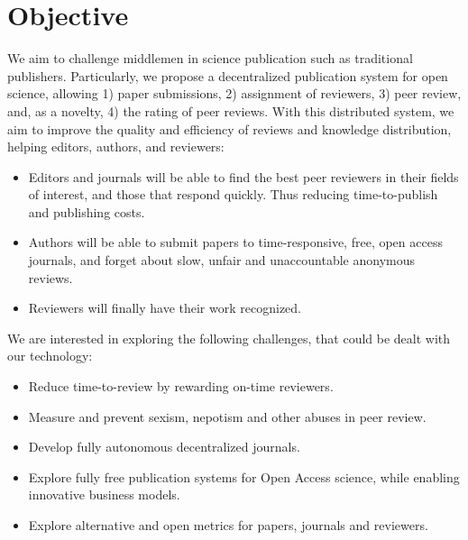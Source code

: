 \section{Objective}

We aim to challenge middlemen in science publication such as traditional
publishers. Particularly, we propose a decentralized publication system for open
science, allowing 1) paper submissions, 2) assignment of reviewers, 3) peer
review, and, as a novelty, 4) the rating of peer reviews. With this distributed
system, we aim to improve the quality and efficiency of reviews and knowledge
distribution, helping editors, authors, and reviewers:
\begin{itemize}
\item Editors and journals will be able to find the best peer reviewers in their
  fields of interest, and those that respond quickly. Thus reducing
  time-to-publish and publishing costs.
\item Authors will be able to submit papers to time-responsive, free, open
  access journals, and forget about slow, unfair and unaccountable anonymous
  reviews.
\item Reviewers will finally have their work recognized.
\end{itemize}

We are interested in exploring the following challenges, that could be dealt
with our technology:
\begin{itemize}
\item Reduce time-to-review by rewarding on-time reviewers.
\item Measure and prevent sexism, nepotism and other abuses in peer review.
\item Develop fully autonomous decentralized journals.
\item Explore fully free publication systems for Open Access science, while
  enabling innovative business models.
\item Explore alternative and open metrics for papers, journals and reviewers.
\end{itemize}

